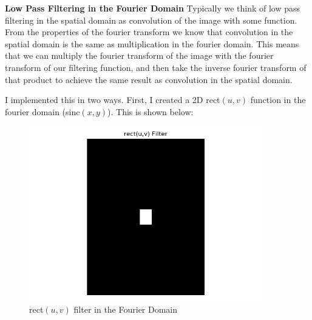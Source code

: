 \documentclass[]{article}
\begin{document}
%	
%	
%	
%	
%	
	\textbf{Low Pass Filtering in the Fourier Domain}
	Typically we think of low pass filtering in the spatial domain as convolution of the image with some function. From the properties of the fourier transform we know that convolution in the spatial domain is the same as multiplication in the fourier domain. This means that we can multiply the fourier transform of the image with the fourier transform of our filtering function, and then take the inverse  fourier transform of that product to achieve the same result as convolution in the spatial domain. 
	
	I implemented this in two ways. First, I created a 2D rect$(u,v)$ function in the fourier domain (sinc$(x,y)$). This is shown below:
	
	\begin{figure}[H]
		\centering
		\includegraphics[width=4in]{p1_output/rect_filter.png}
		\caption{rect$(u,v)$ filter in the Fourier Domain}
	\end{figure}
	
\end{document}
